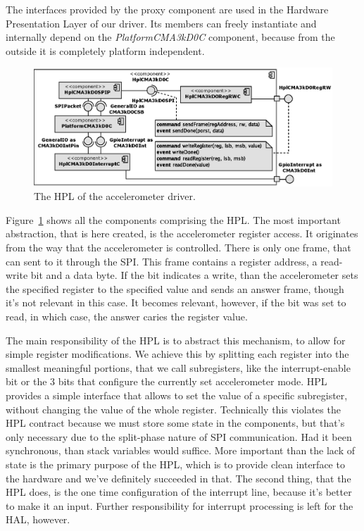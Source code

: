 The interfaces provided by the proxy component are used in the Hardware Presentation Layer of our driver. Its members can freely instantiate and internally depend on the \emph{PlatformCMA3kD0C} component, because from the outside it is completely platform independent.
\begin{figure}[h]
  \centering
  \includegraphics[width=1.0\textwidth]{diagrams/hpl_cma3kd0_c.eps}
  \caption{The HPL of the accelerometer driver.}
  \label{fig:hpl_cma3kd0_c}
\end{figure}
Figure~\ref{fig:hpl_cma3kd0_c} shows all the components comprising the HPL. The most important abstraction, that is here created, is the accelerometer register access. It originates from the way that the accelerometer is controlled. There is only one frame, that can sent to it through the SPI. This frame contains a register address, a read-write bit and a data byte. If the bit indicates a write, than the accelerometer sets the specified register to the specified value and sends an answer frame, though it's not relevant in this case. It becomes relevant, however, if the bit was set to read, in which case, the answer caries the register value.

The main responsibility of the HPL is to abstract this mechanism, to allow for simple register modifications. We achieve this by splitting each register into the smallest meaningful portions, that we call subregisters, like the interrupt-enable bit or the 3 bits that configure the currently set accelerometer mode. HPL provides a simple interface that allows to set the value of a specific subregister, without changing the value of the whole register. Technically this violates the HPL contract because we must store some state in the components, but that's only necessary due to the split-phase nature of SPI communication. Had it been synchronous, than stack variables would suffice. More important than the lack of state is the primary purpose of the HPL, which is to provide clean interface to the hardware and we've definitely succeeded in that.  The second thing, that the HPL does, is the one time configuration of the interrupt line, because it's better to make it an input. Further responsibility for interrupt processing is left for the HAL, however.


